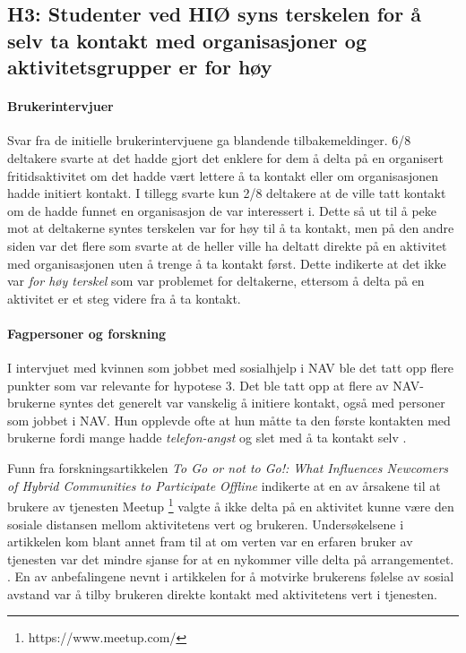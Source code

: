 \subsection{H3: Studenter ved HIØ syns terskelen for å selv ta kontakt med organisasjoner og aktivitetsgrupper er for høy}

\paragraph{Brukerintervjuer}
Svar fra de initielle brukerintervjuene ga blandende tilbakemeldinger. 6/8 deltakere svarte at det hadde gjort det enklere for dem å delta på en organisert fritidsaktivitet om det hadde vært lettere å ta kontakt eller om organisasjonen hadde initiert kontakt. I tillegg svarte kun 2/8 deltakere at de ville tatt kontakt om de hadde funnet en organisasjon de var interessert i. Dette så ut til å peke mot at deltakerne syntes terskelen var for høy til å ta kontakt, men på den andre siden var det flere som svarte at de heller ville ha deltatt direkte på en aktivitet med organisasjonen uten å trenge å ta kontakt først. Dette indikerte at det ikke var {\em for høy terskel} som var problemet for deltakerne, ettersom å delta på en aktivitet er et steg videre fra å ta kontakt.

\paragraph{Fagpersoner og forskning}
I intervjuet med kvinnen som jobbet med sosialhjelp i NAV ble det tatt opp flere punkter som var relevante for hypotese 3. Det ble tatt opp at flere av NAV-brukerne syntes det generelt var vanskelig å initiere kontakt, også med personer som jobbet i NAV. Hun opplevde ofte at hun måtte ta den første kontakten med brukerne fordi mange hadde {\em telefon-angst} og slet med å ta kontakt selv \cite{NAV-INTERVJU:16}.

Funn fra forskningsartikkelen {\em To Go or not to Go!: What Influences Newcomers of Hybrid Communities to Participate Offline} indikerte at en av årsakene til at brukere av tjenesten Meetup \footnote{https://www.meetup.com/} valgte å ikke delta på en aktivitet kunne være den sosiale distansen mellom aktivitetens vert og brukeren. Undersøkelsene i artikkelen kom blant annet fram til at om verten var en erfaren bruker av tjenesten var det mindre sjanse for at en nykommer ville delta på arrangementet. . En av anbefalingene nevnt i artikkelen for å motvirke brukerens følelse av sosial avstand var å tilby brukeren direkte kontakt med aktivitetens vert i tjenesten. \cite{NEWCOMERS:4:CT17}

